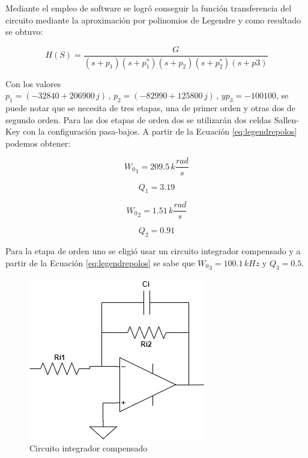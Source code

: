 	Mediante el empleo de software se logró conseguir la función transferencia del circuito mediante la aproximación por polinomios de Legendre y como resultado se obtuvo:
	
\begin{equation}
	H(S) = \dfrac{G}{(s+p_1)(s+p_1^*)(s+p_2)(s+p_2^*)(s+p3)}
\label{eq:legendrepolos}
\end{equation}

	Con los valores $p_1 = (-32840 + 206900 \, j ) \, , \, p_2 = (-82990 + 125800 \, j) \, , \, y p_3 = -100100$, se puede notar que se necesita de tres etapas, una de primer orden y otras dos de segundo orden.
	Para las dos etapas de orden dos se utilizarán dos celdas Sallen-Key con la configuración pasa-bajos. A partir de la Ecuación \ref{eq:legendrepolos} podemos obtener:
	
\begin{equation}
{W_0}_1 = 209.5 \, k \frac{rad}{s}
\label{eq:wo1Legendre}
\end{equation}

\begin{equation}
Q_1 = 3.19
\label{eq:Q1Legendre}
\end{equation}

\begin{equation}
{W_0}_2 = 1.51 \, k \frac{rad}{s}
\label{eq:wo2Legendre}
\end{equation}

\begin{equation}
Q_2 = 0.91
\label{eq:Q2Legendre}
\end{equation}

	Para la etapa de orden uno se eligió usar un circuito integrador compensado y a partir de la Ecuación \eqref{eq:legendrepolos} se sabe que ${W_0}_3 = 100.1 \, kHz$ y $Q_3 = 0.5$.
	
\begin{figure}[H]
	\centering
	\includegraphics[scale=0.5]{../Ex1/Informe/integradorcompensado.jpg}
	\caption{Circuito integrador compensado}
	\label{fig:sallenkeypasabajos}
\end{figure}
	
